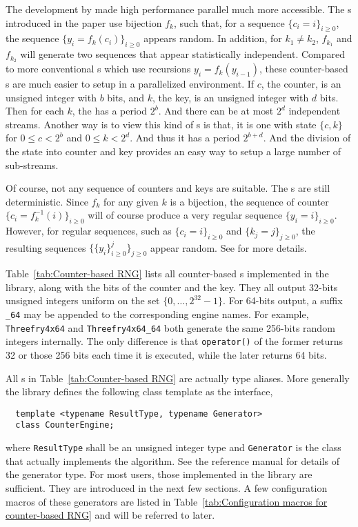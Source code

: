 The development by \textcite{Salmon:2011um} made high performance parallel \rng
much more accessible. The \rng{}s introduced in the paper use bijection $f_k$,
such that, for a sequence $\{c_i = i\}_{i\ge0}$, the sequence $\{y_i =
f_k(c_i)\}_{i\ge0}$ appears random. In addition, for $k_1 \ne k_2$, $f_{k_1}$
and $f_{k_2}$ will generate two sequences that appear statistically
independent. Compared to more conventional \rng{}s which use recursions $y_i =
f_k(y_{i - 1})$, these counter-based \rng{}s are much easier to setup in a
parallelized environment. If $c$, the counter, is an unsigned integer with $b$
bits, and $k$, the key, is an unsigned integer with $d$ bits. Then for each
$k$, the \rng has a period $2^b$. And there can be at most $2^d$ independent
streams. Another way is to view this kind of \rng{}s is that, it is one \rng{}
with state $\{c, k\}$ for $0 \le c < 2^b$ and $0 \le k < 2^d$. And thus it has
a period $2^{b + d}$. And the division of the state into counter and key
provides an easy way to setup a large number of sub-streams.

Of course, not any sequence of counters and keys are suitable. The \rng{}s are
still deterministic. Since $f_k$ for any given $k$ is a bijection, the sequence
of counter $\{c_i = f_k^{-1}(i)\}_{i\ge0}$ will of course produce a very
regular sequence $\{y_i = i\}_{i\ge0}$. However, for regular sequences, such
as $\{c_i = i\}_{i\ge0}$ and $\{k_j = j\}_{j\ge0}$, the resulting sequences
$\{\{y_i\}_{i\ge0}^j\}_{j\ge0}$ appear random. See \textcite{Salmon:2011um} for
more details.

Table~\ref{tab:Counter-based RNG} lists all counter-based \rng{}s implemented
in the library, along with the bits of the counter and the key. They all
output 32-bits unsigned integers uniform on the set $\{0,\dots,2^{32}-1\}$. For
64-bits output, a suffix \verb|_64| may be appended to the corresponding \rng
engine names. For example, \verb|Threefry4x64| and \verb|Threefry4x64_64| both
generate the same 256-bits random integers internally. The only difference is
that \verb|operator()| of the former returns 32 or those 256 bits each time it
is executed, while the later returns 64 bits.

All \rng{}s in Table~\ref{tab:Counter-based RNG} are actually type aliases.
More generally the library defines the following class template as the
interface,
\begin{Verbatim}
  template <typename ResultType, typename Generator>
  class CounterEngine;
\end{Verbatim}
where \verb|ResultType| shall be an unsigned integer type and \verb|Generator|
is the class that actually implements the algorithm. See the reference manual
for details of the generator type. For most users, those implemented in the
library are sufficient. They are introduced in the next few sections. A few
configuration macros of these generators are listed in
Table~\ref{tab:Configuration macros for counter-based RNG} and will be referred
to later.

